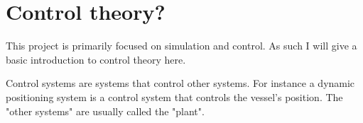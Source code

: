 \section{Control theory?}
This project is primarily focused on simulation and control. As such I will give a basic introduction to control theory here. 

Control systems are systems that control other systems. For instance a dynamic positioning system is a control system that controls the vessel's position. The "other systems" are usually called the "plant". 